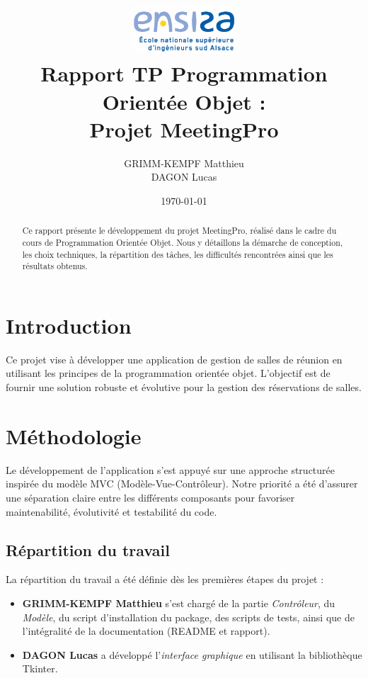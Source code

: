 \documentclass[a4paper,12pt]{article}
\title{
    \includegraphics[width=4cm]{logo.jpg}\\[1cm]
    Rapport TP Programmation Orientée Objet : \\
    \textbf{Projet MeetingPro}
}
\author{
    GRIMM-KEMPF Matthieu \\
    DAGON Lucas
}
\date{\today}
\begin{document}
\maketitle

\begin{abstract}
    Ce rapport présente le développement du projet MeetingPro, réalisé dans le cadre du cours de Programmation Orientée Objet. Nous y détaillons la démarche de conception, les choix techniques, la répartition des tâches, les difficultés rencontrées ainsi que les résultats obtenus.
\end{abstract}

\tableofcontents
\newpage

\section{Introduction}
Ce projet vise à développer une application de gestion de salles de réunion en utilisant les principes de la programmation orientée objet. L'objectif est de fournir une solution robuste et évolutive pour la gestion des réservations de salles.

\section{Méthodologie}

Le développement de l'application s’est appuyé sur une approche structurée inspirée du modèle MVC (Modèle-Vue-Contrôleur). Notre priorité a été d’assurer une séparation claire entre les différents composants pour favoriser maintenabilité, évolutivité et testabilité du code.

\subsection{Répartition du travail}

La répartition du travail a été définie dès les premières étapes du projet :
\begin{itemize}
    \item \textbf{GRIMM-KEMPF Matthieu} s’est chargé de la partie \textit{Contrôleur}, du \textit{Modèle}, du script d’installation du package, des scripts de tests, ainsi que de l’intégralité de la documentation (README et rapport).
    \item \textbf{DAGON Lucas} a développé l'\textit{interface graphique} en utilisant la bibliothèque Tkinter.
\end{itemize}
\end{document}

